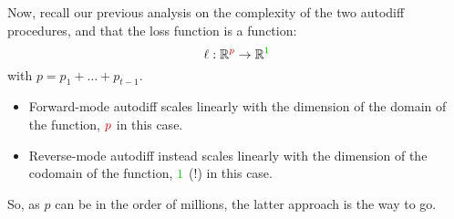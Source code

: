 Now, recall our previous analysis on the complexity of the two autodiff procedures, and that the loss function is a function:
\begin{equation}
    \ell : \mathbb{R}^{\color{red}p} \to \mathbb{R}^{\color{darkgreen} 1}
\end{equation}
with $p = p_1 + \dots + p_{t-1}$.
\begin{itemize}
    \item {\color{red}Forward-mode} autodiff scales linearly with the dimension of the domain of the function, ${\color{red}p}$ in this case.

    \item {\color{darkgreen}Reverse-mode} autodiff instead scales linearly with the dimension of the codomain of the function, ${\color{darkgreen} 1}$ (!) in this case. 
\end{itemize}
So, as $p$ can be in the order of millions, the latter approach is the way to go.




